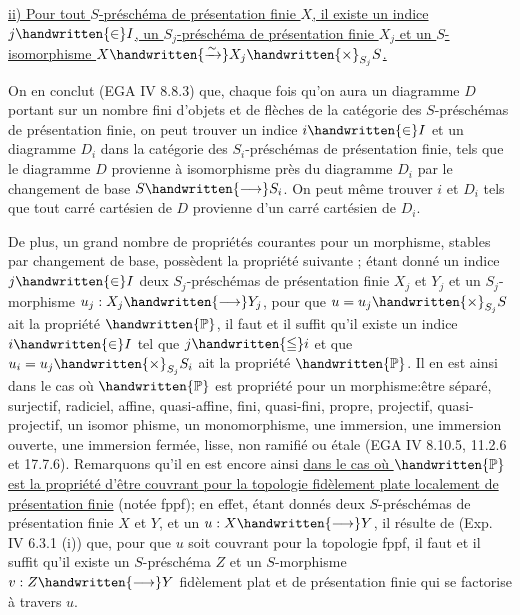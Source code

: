 \uline{ii) Pour tout $S$-préschéma de présentation finie $X$, il existe un indice $j\handwritten{\in}I$,  un $S_j$-préschéma de présentation finie $X_j$ et un $S$-isomorphisme $X\handwritten{\xrightarrow{\sim}}X_j\handwritten{\times}_{S_j}S$.}

On en conclut (EGA IV 8.8.3) que, chaque fois qu'on aura un diagramme $D$ portant sur un nombre fini d'objets et de flèches de la catégorie des $S$-préschémas de présentation finie, on peut trouver un indice $i\handwritten{\in}I$ et un diagramme $D_i$ dans la catégorie des $S_i$-préschémas de présentation finie, tels que le diagramme $D$ provienne à isomorphisme près du diagramme $D_i$ par le changement de base $S\handwritten{\longrightarrow}S_i$. On peut même trouver $i$ et $D_i$ tels que tout carré cartésien de $D$ provienne d'un carré cartésien de $D_i$.

 De plus, un grand nombre de propriétés  courantes pour un morphisme, stables par changement de base, possèdent la propriété suivante ; étant donné un indice $j\handwritten{\in}I$ deux $S_j$-préschémas de présentation finie $X_j$ et $Y_j$ et un $S_j$-morphisme $u_j:X_j\handwritten{\longrightarrow}Y_j$, pour que $u=u_j\handwritten{\times}_{S_j}S$ ait la propriété $\handwritten{\mathbb{P}}$, il faut et il suffit qu'il existe un indice $i\handwritten{\in}I$ tel que $j\handwritten{\leqq}i$ et que $u_i=u_j\handwritten{\times}_{S_j}S_i$ ait la propriété $\handwritten{\mathbb{P}}$. Il en est ainsi dans le cas où $\handwritten{\mathbb{P}}$ est  propriété pour un morphisme:être séparé, surjectif, radiciel, affine, quasi-affine, fini, quasi-fini, propre, projectif, quasi-projectif, un isomor%
%
%
phisme, un monomorphisme, une immersion, une immersion ouverte, une immersion fermée, lisse, non ramifié ou étale (EGA IV 8.10.5, 11.2.6 et 17.7.6). Remarquons qu'il en est encore ainsi  \uline{dans le cas où $\handwritten{\mathbb{P}}$ est la propriété d'être couvrant pour la topologie fidèlement plate localement de présentation finie} (notée fppf); en effet, étant donnés deux $S$-préschémas de présentation finie $X$ et $Y$, et un  $u:X\handwritten{\longrightarrow}Y$, il résulte de (Exp. IV 6.3.1 (i))\deleted{,} que, pour que $u$ soit couvrant pour la topologie fppf, il faut et il suffit qu'il existe un $S$-préschéma $Z$ et un $S$-morphisme $v:Z\handwritten{\longrightarrow}Y$ fidèlement plat et de présentation finie qui se factorise à travers $u$.

